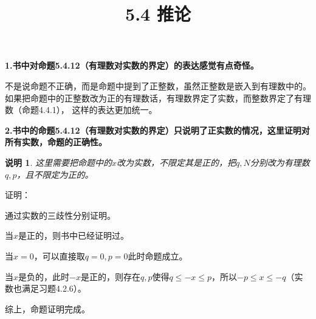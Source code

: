 \documentclass{article}
\theoremstyle{mystyle}
\newtheorem*{zremark}{说明}
\begin{document}
\title{5.4 推论}
\maketitle

\textbf{1.书中对命题5.4.12（有理数对实数的界定）的表达感觉有点奇怪。}

不是说命题不正确，而是命题中提到了正整数，虽然正整数是嵌入到有理数中的。
如果把命题中的正整数改为正的有理数话，有理数界定了实数，而整数界定了有理数（命题4.4.1），
这样的表达更加统一。

\textbf{2.书中的命题5.4.12（有理数对实数的界定）只说明了正实数的情况，这里证明对所有实数，命题的正确性。}

\begin{zgraytheorem}
  \begin{zremark}
    这里需要把命题中的$x$改为实数，不限定其是正的，把$q,N$分别改为有理数$q,p$，且不限定为正的。
  \end{zremark}
\end{zgraytheorem}

证明：

通过实数的三歧性分别证明。

当$x$是正的，则书中已经证明过。

当$x=0$，可以直接取$q=0,p=0$此时命题成立。

当$x$是负的，此时$-x$是正的，则存在$q,p$使得$q \leq -x \leq p$，所以$-p \leq x \leq -q$（实数也满足习题4.2.6）。

综上，命题证明完成。
\end{document}
